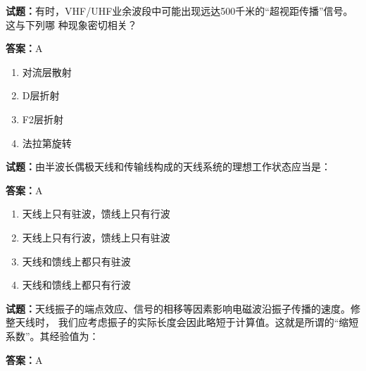 \documentclass{ctexbook}
\begin{document}




\vspace{1em}

\textbf{试题：}有时，VHF/UHF业余波段中可能出现远达500千米的“超视距传播”信号。这与下列哪
种现象密切相关？ 

\textbf{答案：}A 

\begin{enumerate}[leftmargin=3em]
  \item 对流层散射 

  \item D层折射 

  \item F2层折射 

  \item 法拉第旋转 

\end{enumerate}





\vspace{1em}

\textbf{试题：}由半波长偶极天线和传输线构成的天线系统的理想工作状态应当是： 

\textbf{答案：}A 

\begin{enumerate}[leftmargin=3em]
  \item 天线上只有驻波，馈线上只有行波 

  \item 天线上只有行波，馈线上只有驻波 

  \item 天线和馈线上都只有驻波 

  \item 天线和馈线上都只有行波 

\end{enumerate}





\vspace{1em}

\textbf{试题：}天线振子的端点效应、信号的相移等因素影响电磁波沿振子传播的速度。修整天线时，
我们应考虑振子的实际长度会因此略短于计算值。这就是所谓的“缩短系数”。其经验值为： 

\textbf{答案：}A 
\end{document}
